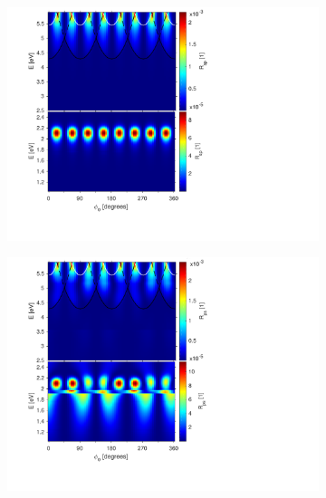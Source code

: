 \begin{figure}  %
    \begin{subfigure}{0.5\textwidth}
        \centering
        \includegraphics[width=\linewidth, trim=1.1cm  1.8cm 6.7cm 0cm, clip]{figures/ch4/S6/contour/S6_Rsp.pdf}
    \end{subfigure}
    \begin{subfigure}{0.5\textwidth}
        \centering
        \includegraphics[width=\linewidth, trim=1.1cm  1.8cm 6.7cm 0cm, clip]{figures/ch4/S6/contour/S6_Rps.pdf}
    \end{subfigure}
    

\end{figure}
